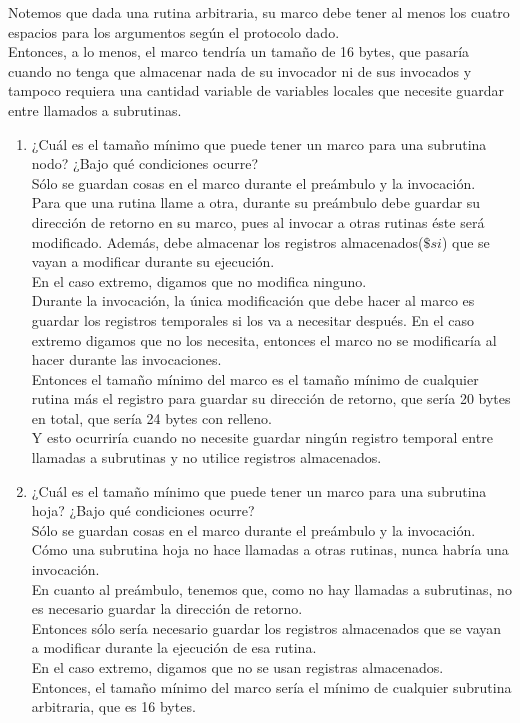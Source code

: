 \documentclass{article}
\begin{document}
\begin{enumerate}
{	Notemos que dada una rutina arbitraria, su marco debe tener al menos los
	cuatro espacios para los argumentos según el protocolo dado.\\
	Entonces, a lo menos, el marco tendría un tamaño de 16 bytes, que pasaría
	cuando no tenga que almacenar nada de su invocador ni de sus invocados y
	tampoco requiera una cantidad variable de variables locales que necesite
	guardar entre llamados a subrutinas.
	
		\begin{enumerate}
			\item {
			¿Cuál es el tamaño mínimo que puede tener un marco para una 
			subrutina nodo? ¿Bajo qué condiciones ocurre?\\
			Sólo se guardan cosas en el marco durante el preámbulo y la 
			invocación.\\
			
			Para que una rutina llame a otra, durante su preámbulo debe guardar 
			su dirección de retorno en su marco, pues al invocar a otras rutinas
			éste será modificado. Además, debe almacenar los registros
			almacenados($\$si$) que se vayan a modificar durante su ejecución.\\
			En el caso extremo, digamos que no modifica ninguno.\\
			Durante la invocación, la única modificación que debe hacer al marco
			es guardar los registros temporales si los va a necesitar después.
			En el caso extremo digamos que no los necesita, entonces el marco 
			no se modificaría al hacer durante las invocaciones.\\
			Entonces el tamaño mínimo del marco es el tamaño mínimo de cualquier
			rutina más el registro para guardar su dirección de retorno, que 
			sería 20 bytes en total, que sería 24 bytes con relleno.\\
			
			Y esto ocurriría cuando no necesite guardar ningún registro temporal
			entre llamadas a subrutinas y no utilice registros almacenados.\\
			}
			\item {
			¿Cuál es el tamaño mínimo que puede tener un marco para una 
			subrutina hoja? ¿Bajo qué condiciones ocurre?\\
			
			Sólo se guardan cosas en el marco durante el preámbulo y la 
			invocación.\\
			Cómo una subrutina hoja no hace llamadas a otras rutinas, nunca 
			habría una invocación.\\
			En cuanto al preámbulo, tenemos que, como no hay llamadas a
			subrutinas, no es necesario guardar la dirección de retorno.\\
			Entonces sólo sería necesario guardar los registros almacenados que 
			se vayan a modificar durante la ejecución de esa rutina.\\
			En el caso extremo, digamos que no se usan registras almacenados.\\
			Entonces, el tamaño mínimo del marco sería el mínimo de cualquier
			subrutina arbitraria, que es 16 bytes.\\
			
}
\end{enumerate}}
\end{enumerate}
\end{document}

